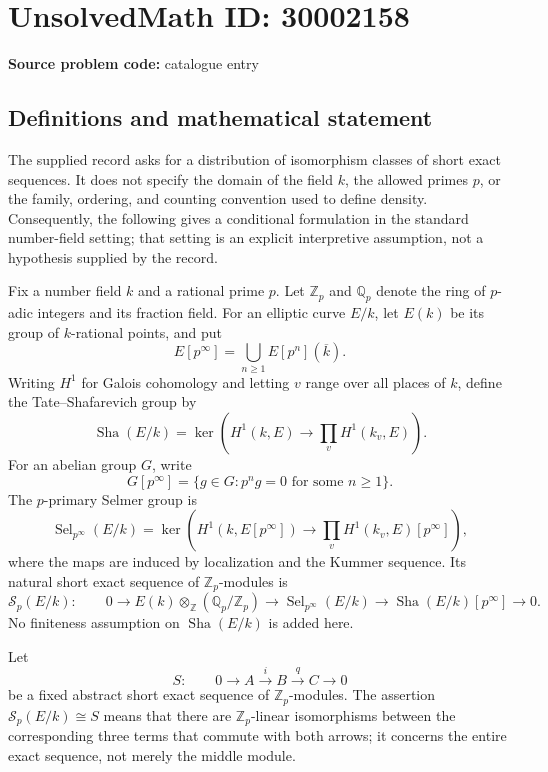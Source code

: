 \documentclass[11pt]{article}
\newcommand{\Z}{\mathbb{Z}}
\newcommand{\Q}{\mathbb{Q}}
\begin{document}
\section*{UnsolvedMath ID: 30002158}
\textbf{Source problem code:} catalogue entry
\subsection{Definitions and mathematical statement}
The supplied record asks for a distribution of isomorphism classes of short exact sequences. It does not specify the domain of the field \(k\), the allowed primes \(p\), or the family, ordering, and counting convention used to define density. Consequently, the following gives a conditional formulation in the standard number-field setting; that setting is an explicit interpretive assumption, not a hypothesis supplied by the record.

Fix a number field \(k\) and a rational prime \(p\). Let \(\Z_p\) and \(\Q_p\) denote the ring of \(p\)-adic integers and its fraction field. For an elliptic curve \(E/k\), let \(E(k)\) be its group of \(k\)-rational points, and put
\[
E[p^\infty]=\bigcup_{n\geq 1}E[p^n](\overline{k}).
\]
Writing \(H^1\) for Galois cohomology and letting \(v\) range over all places of \(k\), define the Tate--Shafarevich group by
\[
\operatorname{Sha}(E/k)=\ker\!\left(H^1(k,E)\longrightarrow\prod_v H^1(k_v,E)\right).
\]
For an abelian group \(G\), write
\[
G[p^\infty]=\{g\in G: p^n g=0\text{ for some }n\geq 1\}.
\]
The \(p\)-primary Selmer group is
\[
\operatorname{Sel}_{p^\infty}(E/k)=\ker\!\left(H^1(k,E[p^\infty])\longrightarrow\prod_v H^1(k_v,E)[p^\infty]\right),
\]
where the maps are induced by localization and the Kummer sequence. Its natural short exact sequence of \(\Z_p\)-modules is
\[
\mathcal S_p(E/k):\qquad
0\longrightarrow E(k)\otimes_{\Z}(\Q_p/\Z_p)
\longrightarrow\operatorname{Sel}_{p^\infty}(E/k)
\longrightarrow\operatorname{Sha}(E/k)[p^\infty]
\longrightarrow 0.
\]
No finiteness assumption on \(\operatorname{Sha}(E/k)\) is added here.

Let
\[
S:\qquad 0\longrightarrow A\xrightarrow{i}B\xrightarrow{q}C\longrightarrow 0
\]
be a fixed abstract short exact sequence of \(\Z_p\)-modules. The assertion \(\mathcal S_p(E/k)\cong S\) means that there are \(\Z_p\)-linear isomorphisms between the corresponding three terms that commute with both arrows; it concerns the entire exact sequence, not merely the middle module.
\end{document}
